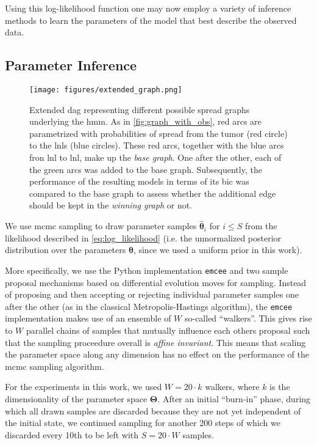 \documentclass[twocolumn]{aastex631}
\begin{document}
Using this log-likelihood function one may now employ a variety of inference methods to learn the parameters of the model that best describe the observed data.


\subsection{Parameter Inference}
\label{subsec:formalism:inference}

\begin{figure}
    \centering
    \texttt{[image: figures/extended\_graph.png]}
    \caption{Extended \gls{dag} representing different possible spread graphs underlying the \gls{hmm}. As in \autoref{fig:graph_with_obs}, red arcs are parametrized with probabilities of spread from the tumor (red circle) to the \glspl{lnl} (blue circles). These red arcs, together with the blue arcs fron \gls{lnl} to \gls{lnl}, make up the \emph{base graph}. One after the other, each of the green arcs was added to the base graph. Subsequently, the performance of the resulting models in terms of its \gls{bic} was compared to the base graph to assess whether the additional edge should be kept in the \emph{winning graph} or not. \label{fig:extended_graph}}
\end{figure}

We use \gls{mcmc} sampling to draw parameter samples $\boldsymbol{\hat{\theta}}_i$ for $i \leq S$ from the likelihood described in \autoref{eq:log_likelihood} (i.e. the unnormalized posterior distribution over the parameters $\boldsymbol{\theta}$, since we used a uniform prior in this work).

More specifically, we use the Python implementation \texttt{emcee} \citep{foreman-mackey_emcee_2013} and two sample proposal mechanisms based on differential evolution moves \citep{ter_braak_differential_2008,nelson_run_2013} for sampling. Instead of proposing and then accepting or rejecting individual parameter samples one after the other (as in the classical Metropolis-Hastings algorithm), the \texttt{emcee} implementation makes use of an ensemble of $W$ so-called ``walkers''. This gives rise to $W$ parallel chains of samples that mutually influence each others proposal such that the sampling proceedure overall is \emph{affine invariant}. This means that scaling the parameter space along any dimension has no effect on the performance of the \gls{mcmc} sampling algorithm.

For the experiments in this work, we used $W = 20 \cdot k$ walkers, where $k$ is the dimensionality of the parameter space $\boldsymbol{\Theta}$. After an initial ``burn-in'' phase, during which all drawn samples are discarded because they are not yet independent of the initial state, we continued sampling for another 200 steps of which we discarded every 10th to be left with $S = 20 \cdot W$ samples.
\end{document}
